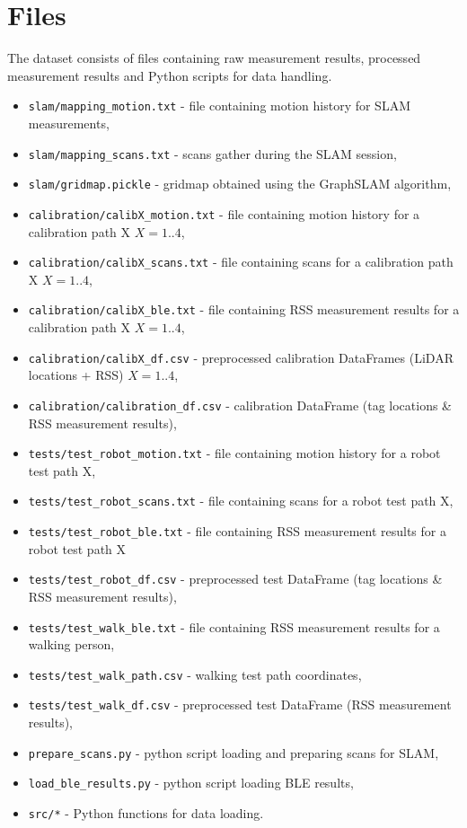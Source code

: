\documentclass[conference]{IEEEtran}
\begin{document}
\section{Files}
The dataset consists of files containing raw measurement results, processed measurement results and Python scripts for data handling. 

\begin{itemize}
\item \texttt{slam/mapping\_motion.txt} - file containing motion history for SLAM measurements,
\item \texttt{slam/mapping\_scans.txt} - scans gather during the SLAM session,
\item \texttt{slam/gridmap.pickle} - gridmap obtained using the GraphSLAM algorithm,
\vspace{8pt}
\item \texttt{calibration/calibX\_motion.txt} - file containing motion history for a calibration path X $X=1..4$,
\item \texttt{calibration/calibX\_scans.txt} - file containing scans for a calibration path X $X=1..4$,
\item \texttt{calibration/calibX\_ble.txt} - file containing RSS measurement results for a calibration path X $X=1..4$,
\item \texttt{calibration/calibX\_df.csv} - preprocessed calibration DataFrames (LiDAR locations + RSS) $X=1..4$,
\item \texttt{calibration/calibration\_df.csv} - calibration DataFrame (tag locations \& RSS measurement results),
\vspace{8pt}
\item \texttt{tests/test\_robot\_motion.txt} - file containing motion history for a robot test path X,
\item \texttt{tests/test\_robot\_scans.txt} - file containing scans for a robot test path X,
\item \texttt{tests/test\_robot\_ble.txt} - file containing RSS measurement results for a robot test path X
\item \texttt{tests/test\_robot\_df.csv} - preprocessed test DataFrame (tag locations \& RSS measurement results),
\item \texttt{tests/test\_walk\_ble.txt} - file containing RSS measurement results for a walking person,
\item \texttt{tests/test\_walk\_path.csv} - walking test path coordinates,
\item \texttt{tests/test\_walk\_df.csv} - preprocessed test DataFrame (RSS measurement results),
\vspace{8pt}
\item \texttt{prepare\_scans.py} - python script loading and preparing scans for SLAM,
\item \texttt{load\_ble\_results.py} - python script loading BLE results,
\item \texttt{src/*} - Python functions for data loading.

\end{itemize} 
\end{document}
